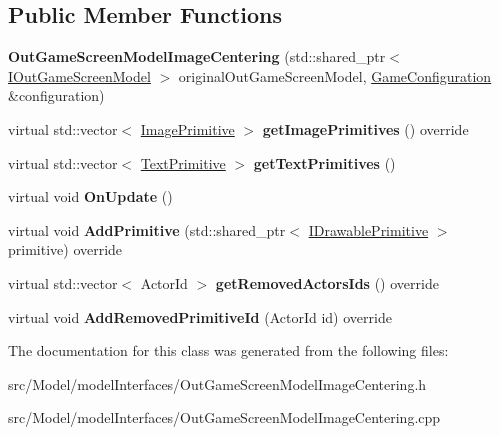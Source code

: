 \subsection*{Public Member Functions}
\begin{DoxyCompactItemize}
\item 
{\bfseries Out\+Game\+Screen\+Model\+Image\+Centering} (std\+::shared\+\_\+ptr$<$ \hyperlink{classIOutGameScreenModel}{I\+Out\+Game\+Screen\+Model} $>$ original\+Out\+Game\+Screen\+Model, \hyperlink{classGameConfiguration}{Game\+Configuration} \&configuration)\hypertarget{classOutGameScreenModelImageCentering_aeb27607c909904240acc9f565753197b}{}\label{classOutGameScreenModelImageCentering_aeb27607c909904240acc9f565753197b}

\item 
virtual std\+::vector$<$ \hyperlink{classImagePrimitive}{Image\+Primitive} $>$ {\bfseries get\+Image\+Primitives} () override\hypertarget{classOutGameScreenModelImageCentering_abb351d906949f60370fd46c06dd990ad}{}\label{classOutGameScreenModelImageCentering_abb351d906949f60370fd46c06dd990ad}

\item 
virtual std\+::vector$<$ \hyperlink{classTextPrimitive}{Text\+Primitive} $>$ {\bfseries get\+Text\+Primitives} ()\hypertarget{classOutGameScreenModelImageCentering_aafc5eff868b437095bb164c0d30bc3ea}{}\label{classOutGameScreenModelImageCentering_aafc5eff868b437095bb164c0d30bc3ea}

\item 
virtual void {\bfseries On\+Update} ()\hypertarget{classOutGameScreenModelImageCentering_aba0fc007cc99953fe0948b80986e4c88}{}\label{classOutGameScreenModelImageCentering_aba0fc007cc99953fe0948b80986e4c88}

\item 
virtual void {\bfseries Add\+Primitive} (std\+::shared\+\_\+ptr$<$ \hyperlink{classIDrawablePrimitive}{I\+Drawable\+Primitive} $>$ primitive) override\hypertarget{classOutGameScreenModelImageCentering_aeb217228acae7e02a6a37630d0cece61}{}\label{classOutGameScreenModelImageCentering_aeb217228acae7e02a6a37630d0cece61}

\item 
virtual std\+::vector$<$ Actor\+Id $>$ {\bfseries get\+Removed\+Actors\+Ids} () override\hypertarget{classOutGameScreenModelImageCentering_a81b052e14f41661ec71cae6ddd0b5a9c}{}\label{classOutGameScreenModelImageCentering_a81b052e14f41661ec71cae6ddd0b5a9c}

\item 
virtual void {\bfseries Add\+Removed\+Primitive\+Id} (Actor\+Id id) override\hypertarget{classOutGameScreenModelImageCentering_ac1670454774ad4135c099d5bdd1e313c}{}\label{classOutGameScreenModelImageCentering_ac1670454774ad4135c099d5bdd1e313c}

\end{DoxyCompactItemize}


The documentation for this class was generated from the following files\+:\begin{DoxyCompactItemize}
\item 
src/\+Model/model\+Interfaces/Out\+Game\+Screen\+Model\+Image\+Centering.\+h\item 
src/\+Model/model\+Interfaces/Out\+Game\+Screen\+Model\+Image\+Centering.\+cpp\end{DoxyCompactItemize}
